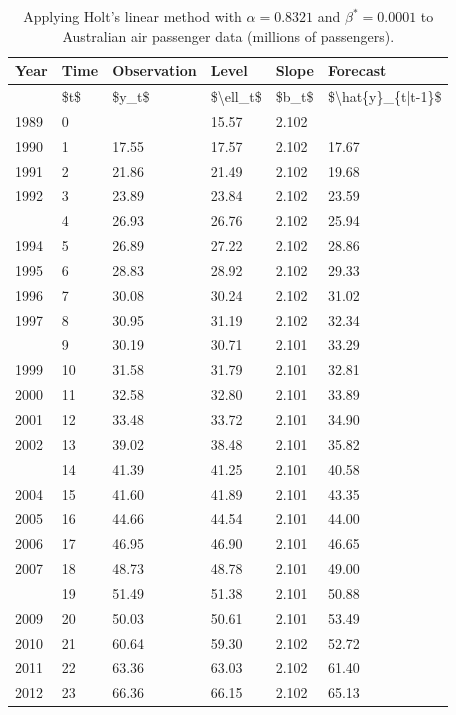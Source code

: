 \documentclass[]{book}
\begin{document}
\begin{table}[t]

\caption{\label{tab:airholt}Applying Holt's linear method with $\alpha=0.8321$ and $\beta^*=0.0001$ to Australian air passenger data (millions of passengers).}
\centering
\begin{tabular}{llllll}
\toprule
Year & Time & Observation & Level & Slope & Forecast\\
\midrule
 & \$t\$ & \$y\_t\$ & \$\textbackslash{}ell\_t\$ & \$b\_t\$ & \$\textbackslash{}hat\{y\}\_\{t|t-1\}\$\\
1989 & 0 &  & 15.57 & 2.102 & \\
1990 & 1 & 17.55 & 17.57 & 2.102 & 17.67\\
1991 & 2 & 21.86 & 21.49 & 2.102 & 19.68\\
1992 & 3 & 23.89 & 23.84 & 2.102 & 23.59\\
\addlinespace
1993 & 4 & 26.93 & 26.76 & 2.102 & 25.94\\
1994 & 5 & 26.89 & 27.22 & 2.102 & 28.86\\
1995 & 6 & 28.83 & 28.92 & 2.102 & 29.33\\
1996 & 7 & 30.08 & 30.24 & 2.102 & 31.02\\
1997 & 8 & 30.95 & 31.19 & 2.102 & 32.34\\
\addlinespace
1998 & 9 & 30.19 & 30.71 & 2.101 & 33.29\\
1999 & 10 & 31.58 & 31.79 & 2.101 & 32.81\\
2000 & 11 & 32.58 & 32.80 & 2.101 & 33.89\\
2001 & 12 & 33.48 & 33.72 & 2.101 & 34.90\\
2002 & 13 & 39.02 & 38.48 & 2.101 & 35.82\\
\addlinespace
2003 & 14 & 41.39 & 41.25 & 2.101 & 40.58\\
2004 & 15 & 41.60 & 41.89 & 2.101 & 43.35\\
2005 & 16 & 44.66 & 44.54 & 2.101 & 44.00\\
2006 & 17 & 46.95 & 46.90 & 2.101 & 46.65\\
2007 & 18 & 48.73 & 48.78 & 2.101 & 49.00\\
\addlinespace
2008 & 19 & 51.49 & 51.38 & 2.101 & 50.88\\
2009 & 20 & 50.03 & 50.61 & 2.101 & 53.49\\
2010 & 21 & 60.64 & 59.30 & 2.102 & 52.72\\
2011 & 22 & 63.36 & 63.03 & 2.102 & 61.40\\
2012 & 23 & 66.36 & 66.15 & 2.102 & 65.13\\

\end{tabular}
\end{table}
\end{document}
